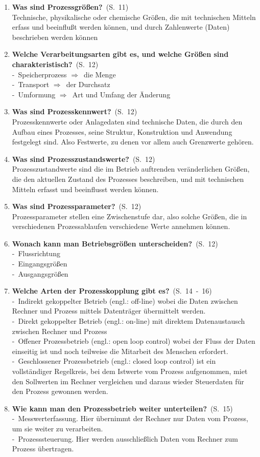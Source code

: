 \documentclass[a4paper,12pt]{article}
\newcommand{\question}[3]{\pagebreak[3]\item {\textbf{#1?}}\ (S.\ #2)#3}
\newcommand{\catchword}[1]{\\-\ #1}
\newcommand{\normaltext}[1]{\\#1}
\newcommand{\resultol}[1]{ $\Rightarrow$\ #1}
\newcommand{\page}[1]{#1}
\newcommand{\pages}[2]{#1\ -\ #2}
\begin{document}
\begin{enumerate}
  \question{Was sind Prozessgrößen}{\page{11}}
  {
    \normaltext{Technische, physikalische oder chemische Größen, die mit technischen Mitteln
    erfass und beeinflußt werden können, und durch Zahlenwerte (Daten) beschrieben werden können}
  }

  \question{Welche Verarbeitungsarten gibt es, und welche Größen sind charakteristisch}{\page{12}}
  {
    \catchword{Speicherprozess \resultol{die Menge}}
    \catchword{Transport \resultol{der Durchsatz}}
    \catchword{Umformung \resultol{Art und Umfang der Änderung}}
  }
  \question{Was sind Prozesskennwert}{\page{12}}
  {
    \normaltext{Prozesskennwerte oder Anlagedaten sind technische Daten, die durch den Aufbau eines
    Prozesses, seine Struktur, Konstruktion und Anwendung festgelegt sind. Also Festwerte, zu denen
    vor allem auch Grenzwerte gehören.}
  }

  \question{Was sind Prozesszustandswerte}{\page{12}}
  {
    \normaltext{Prozesszustandwerte sind die im Betrieb auftrenden veränderlichen Größen, die den 
    aktuellen Zustand des Prozesses beschreiben, und mit technischen Mitteln erfasst und beeinflusst
    werden können.}
  }

  \question{Was sind Prozessparameter}{\page{12}}
  {
    \normaltext{Prozessparameter stellen eine Zwischenstufe dar, also solche Größen, die in verschiedenen
    Prozessablaufen verschiedene Werte annehmen können.}
  }

  \question{Wonach kann man Betriebsgrößen unterscheiden}{\page{12}}
  {
    \catchword{Flussrichtung}
    \catchword{Eingangsgrößen}
    \catchword{Ausgangsgrößen}
  }

  \question{Welche Arten der Prozesskopplung gibt es}{\pages{14}{16}}
  {
    \catchword{Indirekt gekoppelter Betrieb (engl.: off-line) wobei die Daten zwischen Rechner und Prozess
    mittels Datenträger übermittelt werden.}
    \catchword{Direkt gekoppelter Betrieb (engl.: on-line) mit direktem Datenaustausch
               zwischen Rechner und Prozess}
    \catchword{Offener Prozessbetrieb (engl.: open loop control) wobei der Fluss der Daten
               einseitig ist und noch teilweise die Mitarbeit des Menschen erfordert.}
    \catchword{Geschlossener Prozessbetrieb (engl.: closed loop control) ist ein vollständiger
               Regelkreis, bei dem Istwerte vom Prozess aufgenommen, miet den Sollwerten im
               Rechner vergleichen und daraus wieder Steuerdaten für den Prozess gewonnen werden.}
  }

  \question{Wie kann man den Prozessbetrieb weiter unterteilen}{\page{15}}
  {
    \catchword{Messwerterfassung. Hier übernimmt der Rechner nur Daten vom Prozess,
               um sie weiter zu verarbeiten.}
    \catchword{Prozesssteuerung. Hier werden ausschließlich Daten vom Rechner zum Prozess übertragen. }
  }


\end{enumerate}
\end{document}
